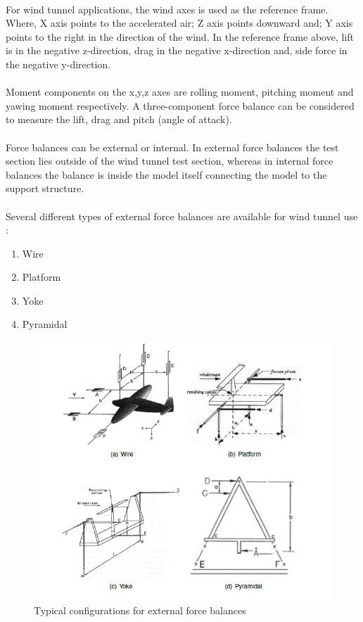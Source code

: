 \paragraph{}For wind tunnel applications, the wind axes is used as the reference frame. Where, X axis points to the accelerated air; Z axis points downward and; Y axis points to the right in the direction of the wind. In the reference frame above, lift is in the negative z-direction, drag in the negative x-direction and, side force in the negative y-direction.
\paragraph{}Moment components on the x,y,z axes are rolling moment, pitching moment and yawing moment respectively. A three-component force balance can be considered to measure the lift, drag and pitch (angle of attack).
\paragraph{}Force balances can be external or internal. In external force balances the test section lies outside of the wind tunnel test section, whereas in internal force balances the balance is inside the model itself connecting the model to the support structure.
\paragraph{}Several different types of external force balances are available for wind tunnel use
\cite{morris_force_2010}:
\begin{enumerate}
\item Wire
\item Platform
\item Yoke
\item Pyramidal
\end{enumerate}
\begin{center}
	\begin{figure}[!h]
	\centering
	\includegraphics{Figures/Fig6}
	\caption{Typical configurations for external force balances}
	\end{figure}
\end{center}
